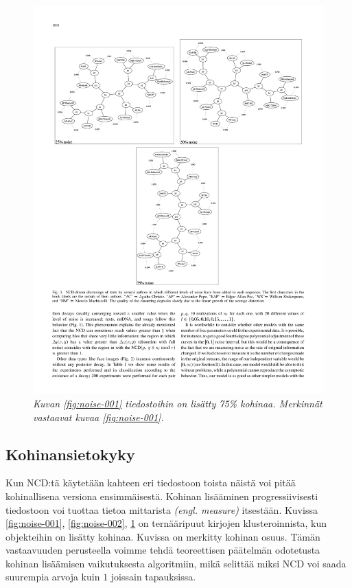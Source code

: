 \documentclass[12pt,finnish]{tktltiki2}
\theoremstyle{definition}
\theoremstyle{remark}
\newcommand{\engl}[1]{\emph{(engl. #1)}}
\begin{document}
    \begin{figure}[tb]
      \immediate{}
      \includegraphics{img/noise-003}
      \caption{\emph{Kuvan \ref{fig:noise-001} tiedostoihin on lisätty 75\% kohinaa. Merkinnät vastaavat kuvaa \ref{fig:noise-001}.}
      \cite{4167725}}
      \label{fig:noise-003}
    \end{figure}
  \subsection{Kohinansietokyky} %
  \label{sub:kohinansietokyky}

    Kun NCD:tä käytetään kahteen eri tiedostoon toista näistä voi pitää kohinallisena versiona ensimmäisestä.
    Kohinan lisääminen progressiivisesti tiedostoon voi tuottaa tietoa mittarista \engl{measure} itsestään.
    Kuvissa \ref{fig:noise-001}, \ref{fig:noise-002}, \ref{fig:noise-003} on ternääripuut kirjojen klusteroinnista, kun objekteihin on lisätty kohinaa. Kuvissa on merkitty kohinan osuus.
    Tämän vastaavuuden perusteella voimme tehdä teoreettisen päätelmän odotetusta kohinan lisäämisen vaikutuksesta algoritmiin, mikä selittää miksi NCD voi saada suurempia arvoja kuin $1$ joissain tapauksissa. \cite{4167725}
\end{document}
